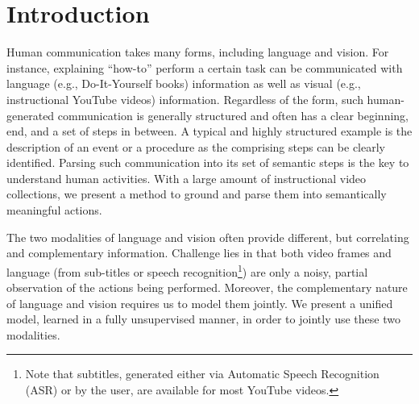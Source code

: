 
\section{Introduction}
Human communication takes many forms, including language and vision. For instance, explaining ``how-to'' perform a certain task can be communicated with language (e.g., Do-It-Yourself books) information as well as visual (e.g., instructional YouTube videos) information. Regardless of the form, such human-generated communication is generally structured and often has a clear beginning, end, and a set of steps in between. A typical and highly structured example is the description of an event or a procedure as the comprising steps can be clearly identified. Parsing such communication into its set of semantic steps is the key to understand human activities. With a large amount of instructional video collections, we present a method to ground and parse them into semantically meaningful actions.



%

The two modalities of language and vision often provide different, but correlating and complementary information. Challenge lies in that both video frames and language (from sub-titles or speech recognition\footnote{Note that subtitles, generated either via Automatic Speech Recognition (ASR) or by the user, are available for most YouTube videos.}) are only a noisy, partial observation of the actions being performed. Moreover, the complementary nature of language and vision requires us to model them jointly. We present a unified model, learned in a fully unsupervised manner, in order to jointly use these two modalities.




